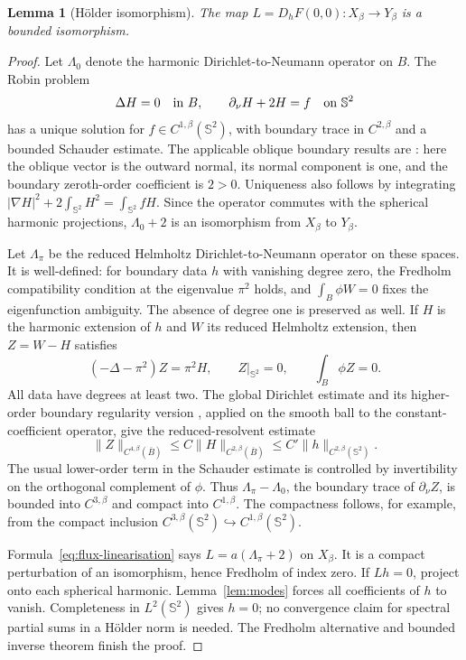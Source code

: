 \documentclass[11pt,a4paper]{article}
\newtheorem{lemma}[theorem]{Lemma}
\theoremstyle{definition}
\theoremstyle{remark}
\begin{document}
\begin{lemma}[H\"older isomorphism]\label{lem:inverse}
The map $L=D_hF(0,0):X_\beta\to Y_\beta$ is a bounded isomorphism.
\end{lemma}
\begin{proof}
Let $\Lambda_0$ denote the harmonic Dirichlet-to-Neumann operator on $B$. The Robin problem
\[
 \Delta H=0\quad\hbox{in }B,\qquad
 \partial_\nu H+2H=f\quad\hbox{on }\mathbb S^2
\]
has a unique solution for $f\in C^{1,\beta}(\mathbb S^2)$, with boundary trace in $C^{2,\beta}$ and a bounded Schauder estimate. The applicable oblique boundary results are \cite[Theorems~6.30--6.31]{GT2001}: here the oblique vector is the outward normal, its normal component is one, and the boundary zeroth-order coefficient is $2>0$. Uniqueness also follows by integrating $|\nabla H|^2+2\int_{\mathbb S^2}H^2=\int_{\mathbb S^2}fH$. Since the operator commutes with the spherical harmonic projections, $\Lambda_0+2$ is an isomorphism from $X_\beta$ to $Y_\beta$.

Let $\Lambda_\pi$ be the reduced Helmholtz Dirichlet-to-Neumann operator on these spaces. It is well-defined: for boundary data $h$ with vanishing degree zero, the Fredholm compatibility condition at the eigenvalue $\pi^2$ holds, and $\int_B\phi W=0$ fixes the eigenfunction ambiguity. The absence of degree one is preserved as well. If $H$ is the harmonic extension of $h$ and $W$ its reduced Helmholtz extension, then $Z=W-H$ satisfies
\[
 (-\Delta-\pi^2)Z=\pi^2H,\qquad Z|_{\mathbb S^2}=0,
 \qquad \int_B\phi Z=0.
\]
All data have degrees at least two. The global Dirichlet estimate \cite[Theorem~6.6]{GT2001} and its higher-order boundary regularity version \cite[Theorem~6.19, with $k=2$]{GT2001}, applied on the smooth ball to the constant-coefficient operator, give the reduced-resolvent estimate
\[
 \|Z\|_{C^{4,\beta}(\overline B)}
       \leq C\|H\|_{C^{2,\beta}(\overline B)}
       \leq C'\|h\|_{C^{2,\beta}(\mathbb S^2)}.
\]
The usual lower-order term in the Schauder estimate is controlled by invertibility on the orthogonal complement of $\phi$. Thus $\Lambda_\pi-\Lambda_0$, the boundary trace of $\partial_\nu Z$, is bounded into $C^{3,\beta}$ and compact into $C^{1,\beta}$. The compactness follows, for example, from the compact inclusion $C^{3,\beta}(\mathbb S^2)\hookrightarrow C^{1,\beta}(\mathbb S^2)$.

Formula~\eqref{eq:flux-linearisation} says $L=a(\Lambda_\pi+2)$ on $X_\beta$. It is a compact perturbation of an isomorphism, hence Fredholm of index zero. If $Lh=0$, project onto each spherical harmonic. Lemma~\ref{lem:modes} forces all coefficients of $h$ to vanish. Completeness in $L^2(\mathbb S^2)$ gives $h=0$; no convergence claim for spectral partial sums in a H\"older norm is needed. The Fredholm alternative and bounded inverse theorem finish the proof.
\end{proof}
\end{document}
